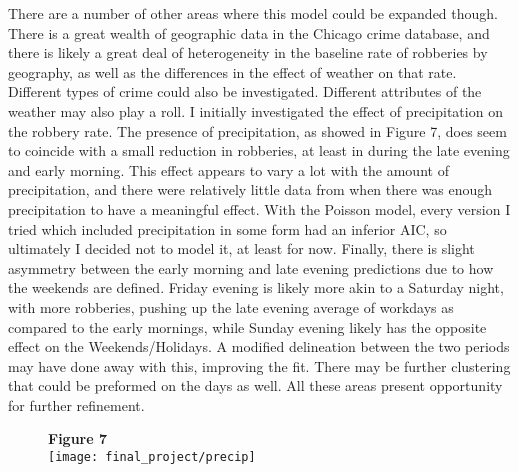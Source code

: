 \documentclass[11pt]{article}
\theoremstyle{definition}
\begin{document}
There are a number of other areas where this model could be expanded though. There is a great wealth of geographic data in the Chicago crime database, and there is likely a great deal of heterogeneity in the baseline rate of robberies by geography, as well as the differences in the effect of weather on that rate. Different types of crime could also be investigated. Different attributes of the weather may also play a roll. I initially investigated the effect of precipitation on the robbery rate. The presence of precipitation, as showed in Figure 7, does seem to coincide with a small reduction in robberies, at least in during the late evening and early morning. This effect appears to vary a lot with the amount of precipitation, and there were relatively little data from when there was enough precipitation to have a meaningful effect. With the Poisson model, every version I tried which included precipitation in some form had an inferior AIC, so ultimately I decided not to model it, at least for now. Finally, there is slight asymmetry between the early morning and late evening predictions due to how the weekends are defined. Friday evening is likely more akin to a Saturday night, with more robberies, pushing up the late evening average of workdays as compared to the early mornings, while Sunday evening likely has the opposite effect on the Weekends/Holidays. A modified delineation between the two periods may have done away with this, improving the fit. There may be further clustering that could be preformed on the days as well. All these areas present opportunity for further refinement.

\begin{figure}[h]
    {\bf Figure 7} \\
    \texttt{[image: final\_project/precip]}
\end{figure}
\end{document}
